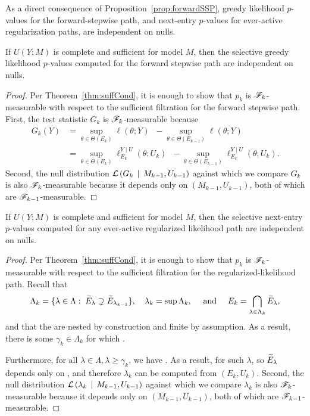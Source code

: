 \documentclass{article}
\begin{document}
As a direct consequence of Proposition~\ref{prop:forwardSSP}, greedy likelihood $p$-values for the forward-stepwise path, and next-entry $p$-values for ever-active regularization paths, are independent on nulls.

\begin{corollary}\label{cor:greedyLikIndep}
  If $U(Y; M)$ is complete and sufficient for model $M$, then the selective greedy likelihood $p$-values computed for the forward stepwise path are independent on nulls.
\end{corollary}
\begin{proof}
  Per Theorem~\ref{thm:suffCond}, it is enough to show that $p_k$ is $\mathscr{F}_k$-measurable with respect to the sufficient filtration for the forward stepwise path. First, the test statistic $G_k$ is $\mathscr{F}_k$-measurable because
  \begin{align*}
    G_k(Y) &= \sup_{\theta\in \Theta(E_k)} {\ell(\theta; Y)} \;\;- \sup_{\theta\in \Theta(E_{k-1})} {\ell(\theta; Y)}\\
    &= \sup_{\theta\in \Theta(E_k)} {\ell_{E_k}^{Y\mid U}(\theta; U_k)} \;\;- \sup_{\theta\in \Theta(E_{k-1})} {\ell_{E_k}^{Y\mid U}(\theta; U_k)}.
  \end{align*}
  Second, the null distribution $\mathcal{L}\left(G_k \,\mid\, M_{k-1}, U_{k-1}\right)$ against which we compare $G_k$ is also $\mathscr{F}_k$-measurable because it depends only on $(M_{k-1}, U_{k-1})$, both of which are $\mathscr{F}_{k-1}$-measurable.
\end{proof}

\begin{corollary}\label{cor:nextLambdaIndep}
  If $U(Y; M)$ is complete and sufficient for model $M$, then the selective next-entry $p$-values computed for any ever-active regularized likelihood path are independent on nulls.
\end{corollary}
\begin{proof}
  Per Theorem~\ref{thm:suffCond}, it is enough to show that $p_k$ is $\mathscr{F}_k$-measurable with respect to the  sufficient filtration for the regularized-likelihood path.  Recall that 
  \[
  \Lambda_k = \{\lambda\in \Lambda:\; \widetilde{E}_\lambda \supsetneq \widetilde{E}_{\lambda_{k-1}}\},
  \quad 
  \lambda_k = \sup\Lambda_k,
  \quad \text{ and } \quad
  E_k = \bigcap_{\lambda\in\Lambda_k} \widetilde{E}_{\lambda},
  \]
  and that the \smash{$\tE_{\lambda}$} are nested by construction and finite by assumption. As a result, there is some $\gamma_k\in \Lambda_k$ for which . 
  
  Furthermore, for all $\lambda\in\Lambda, \lambda\geq \gamma_k$, we have . As a result,  for such $\lambda$, so $\tE_{\lambda}$ depends only on , and therefore $\lambda_k$ can be computed from $(E_k, U_k)$.  Second, the null distribution $\mathcal{L}\left(\lambda_k \,\mid\, M_{k-1}, U_{k-1}\right)$ against which we compare $\lambda_k$ is also $\mathscr{F}_k$-measurable because it depends only on $(M_{k-1}, U_{k-1})$, both of which are $\mathscr{F}_{k-1}$-measurable.
\end{proof}
\end{document}
